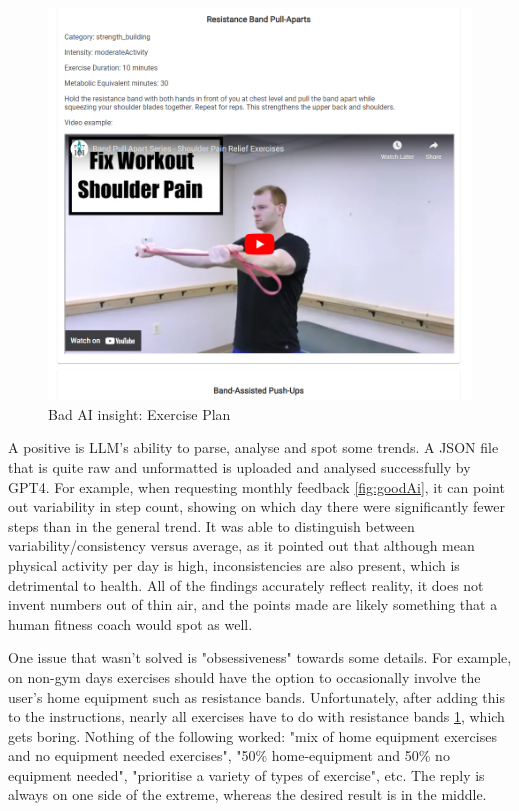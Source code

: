 \begin{figure}
    
    \centering
    \includegraphics[width=1\textwidth,keepaspectratio]{../images/BadAi.png}
    \caption{Bad AI insight: Exercise Plan}
    \label{fig:badAi}
    
\end{figure}

A positive is LLM's ability to parse, analyse and spot some trends. A JSON file that is quite raw and unformatted is uploaded and analysed successfully by GPT4. For example, when requesting monthly feedback \ref{fig:goodAi}, it can point out variability in step count, showing on which day there were significantly fewer steps than in the general trend. It was able to distinguish between variability/consistency versus average, as it pointed out that although mean physical activity per day is high, inconsistencies are also present, which is detrimental to health. All of the findings accurately reflect reality, it does not invent numbers out of thin air, and the points made are likely something that a human fitness coach would spot as well.

One issue that wasn't solved is "obsessiveness" towards some details. For example, on non-gym days exercises should have the option to occasionally involve the user's home equipment such as resistance bands. Unfortunately, after adding this to the instructions, nearly all exercises have to do with resistance bands \ref{fig:badAi}, which gets boring. Nothing of the following worked: "mix of home equipment exercises and no equipment needed exercises", "50\% home-equipment and 50\% no equipment needed", "prioritise a variety of types of exercise", etc. The reply is always on one side of the extreme, whereas the desired result is in the middle.

